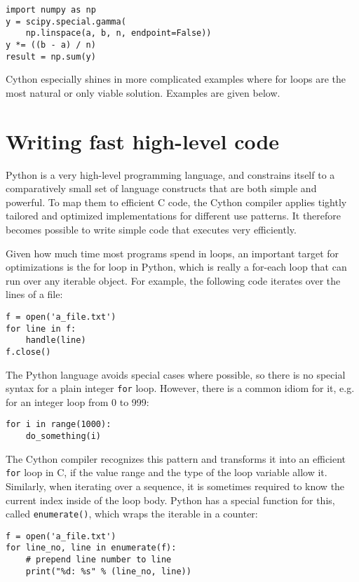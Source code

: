 \documentclass[letterpaper,11pt,english]{article}
\newcommand{\code}[1]{\texttt{#1}}
\begin{document}
\begin{verbatim}
import numpy as np
y = scipy.special.gamma(
    np.linspace(a, b, n, endpoint=False))
y *= ((b - a) / n)
result = np.sum(y)
\end{verbatim}


Cython especially shines in more complicated examples where for loops
are the most natural or only viable solution. Examples are
given below.


\section{Writing fast high-level code}

Python is a very high-level programming language, and constrains
itself to a comparatively small set of language constructs that are
both simple and powerful.  To map them to efficient C code, the Cython
compiler applies tightly tailored and optimized implementations for
different use patterns.  It therefore becomes possible to write simple
code that executes very efficiently.

Given how much time most programs spend in loops, an important target
for optimizations is the for loop in Python, which is really a
for-each loop that can run over any iterable object.  For example, the
following code iterates over the lines of a file:

\begin{verbatim}
f = open('a_file.txt')
for line in f:
    handle(line)
f.close()
\end{verbatim}

The Python language avoids special cases where possible, so there is
no special syntax for a plain integer \code{for} loop.  However, there is
a common idiom for it, e.g. for an integer loop from 0 to 999:

\begin{verbatim}
for i in range(1000):
    do_something(i)
\end{verbatim}

The Cython compiler recognizes this pattern and transforms it into an
efficient \code{for} loop in C, if the value range and the type of the loop
variable allow it.  Similarly, when iterating over a sequence, it is
sometimes required to know the current index inside of the loop body.
Python has a special function for this, called \code{enumerate()}, which
wraps the iterable in a counter:

\begin{verbatim}
f = open('a_file.txt')
for line_no, line in enumerate(f):
    # prepend line number to line
    print("%d: %s" % (line_no, line))
\end{verbatim}
\end{document}
